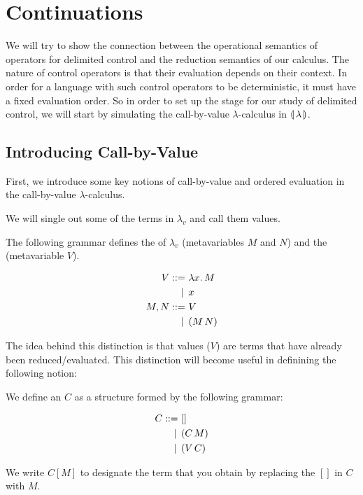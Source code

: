 \chapter{Continuations}
\label{chap:continuations}

We will try to show the connection between the operational semantics of
operators for delimited control and the reduction semantics of our
calculus. The nature of control operators is that their evaluation depends
on their context. In order for a language with such control operators to be
deterministic, it must have a fixed evaluation order. So in order to set up
the stage for our study of delimited control, we will start by simulating
the call-by-value $\lambda$-calculus in $\llparenthesis \, \lambda \, \rrparenthesis$.


\section{Introducing Call-by-Value}

First, we introduce some key notions of call-by-value and ordered
evaluation in the call-by-value $\lambda$-calculus.

We will single out some of the terms in $\lambda_v$ and call them values.

\begin{definition}
  The following grammar defines the  of $\lambda_v$
  (metavariables $M$ and $N$) and the  (metavariable $V$).

\begin{align*}
  V ::= &\ \lambda x.\, M \\
   | \, &\ x \\
  M, N ::= &\ V \\
   | \, &\ (M\,N)
\end{align*}
\end{definition}

The idea behind this distinction is that values ($V$) are terms that have
already been reduced/evaluated. This distinction will become useful in
definining the following notion:

\begin{definition}
  We define an  $C$ as a structure formed by the
  following grammar:

\begin{align*}
  C ::= &\ [] \\
  | \, &\ (C\,M) \\
  | \, &\ (V\,C)
\end{align*}

  We write $C[M]$ to designate the term that you obtain by replacing the
  $[]$ in $C$ with $M$.
\end{definition}

